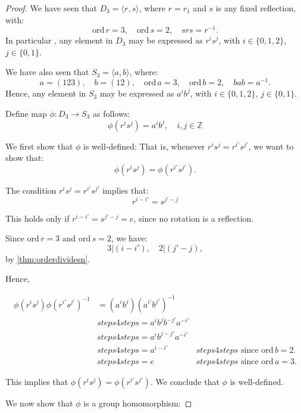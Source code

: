 \documentclass[a4paper,12pt]{report}
\newcommand{\ord}{\mathrm{ord}\,}
\newcommand{\class}{}
\renewcommand{\ord}{\mathrm{ord}\,}
\numberwithin{statement}{chapter}
\numberwithin{equation}{chapter}
\numberwithin{section}{chapter}
\numberwithin{subsection}{section}
\begin{document}
\begin{proof}

We have seen that $D_3 = \langle r, s\rangle$, where $r = r_1$ and 
$s$ is any fixed reflection,
with:
\[
\ord r = 3,\quad \ord s = 2,\quad srs = r^{-1}.
\]
In particular , any element in $D_3$ may be expressed as $r^is^j$,
with $i \in \{0, 1, 2\}$, $j \in \{0, 1\}$.




We have also seen that $S_3 = \langle a, b \rangle$, 
where:
\[
a = (123),\quad b = (12),\quad \ord a = 3,\quad \ord b = 2, \quad bab = a^{-1}.
\]
Hence, any element in $S_3$ may be expressed as $a^ib^j$,
with $i \in \{0, 1, 2\}$, $j \in \{0, 1\}$.




Define map $\phi: D_3 \longrightarrow S_3$ as follows:
\[
\phi(r^is^j) = a^ib^j, \quad i, j \in \mathbb{Z}
\]




We first show that $\phi$ is well-defined:
That is, whenever $r^i s^j = r^{i'}s^{j'}$,
we want to show that:
\[
\phi(r^i s^j) = \phi(r^{i'}s^{j'}).
\]

The condition $r^i s^j = r^{i'}s^{j'}$ implies that:
\[
r^{i - i'} = s^{j' - j}
\]

This holds only if  $r^{i - i'} = s^{j' - j} = e$,
since no rotation is a reflection.




Since $\ord r = 3$ and $\ord s = 2$, we have:
\[
3 | (i - i'), \quad 2 | (j' - j),
\]
by \cref{thm:orderdividesn}.




Hence,

\begin{align*}
\phi(r^is^j) \phi(r^{i'}s^{j'})^{-1} 
&= (a^ib^j)(a^{i'}b^{j'})^{-1}
&
\\
&
\class{steps4 steps}{= a^i b^jb^{-j'} a^{-i'}} 
&
\\
&
\class{steps4 steps}{= a^i b^{j - j'} a^{-i'}} 
&
\\
&
\class{steps4 steps}{= a^{i - i'}} 
&
\class{steps4 steps}{\text{ since } \ord b = 2.}
\\
&
\class{steps4 steps}{ = e} 
&
\class{steps4 steps}{\text{ since } \ord a = 3.}
\end{align*}

This implies that 
$\phi(r^is^j) = \phi(r^{i'}s^{j'})$.
We conclude that $\phi$ is well-defined.




We now show that $\phi$ is a group homomorphism:





\end{proof}
\end{document}
